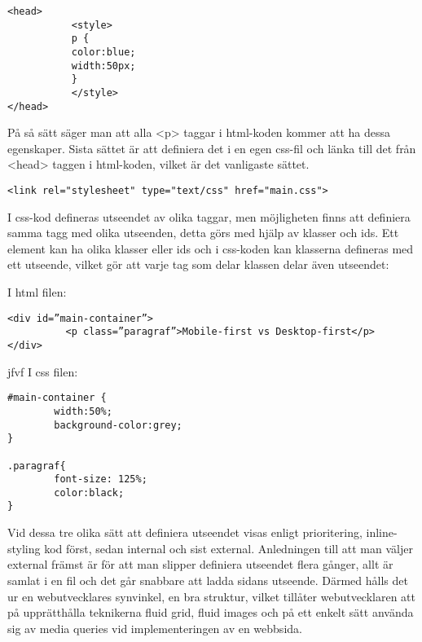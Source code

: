 \documentclass[11pt]{article}
\begin{document}
\vspace{1cm}
\begin{verbatim}
<head>
           <style>
           p {
           color:blue;
           width:50px;
           }
           </style>
</head>
\end{verbatim}
\vspace{1cm}

På så sätt säger man att alla <p> taggar i html-koden kommer att ha dessa egenskaper. Sista sättet är att definiera det i en egen css-fil och länka till det från <head> taggen i html-koden, vilket är det vanligaste sättet. 

\begin{verbatim}
<link rel="stylesheet" type="text/css" href="main.css">
\end{verbatim}
\vspace{1cm}

I css-kod defineras utseendet av olika taggar, men möjligheten finns att definiera samma tagg med olika utseenden, detta görs med hjälp av klasser och ids. Ett element kan ha olika klasser eller ids och i css-koden kan klasserna defineras med ett utseende, vilket gör att varje tag som delar klassen delar även utseendet:

\vspace{0.5cm}
I html filen:

\begin{verbatim}
<div id=”main-container”>
          <p class=”paragraf”>Mobile-first vs Desktop-first</p>
</div>
\end{verbatim}
jfvf
I css filen:

\begin{verbatim}
#main-container {
        width:50%;
        background-color:grey;
}

.paragraf{
        font-size: 125%;
        color:black;
}
\end{verbatim}
\vspace{1cm}

Vid dessa tre olika sätt att definiera utseendet visas enligt prioritering, inline-styling kod först, sedan internal och sist external. Anledningen till att man väljer external främst är för att man slipper definiera utseendet flera gånger, allt är samlat i en fil och det går snabbare att ladda sidans utseende. Därmed hålls det ur en webutvecklares synvinkel, en bra struktur, vilket tillåter webutvecklaren att på upprätthålla teknikerna fluid grid, fluid images och på ett enkelt sätt använda sig av media queries vid implementeringen av en webbsida.
\end{document}
